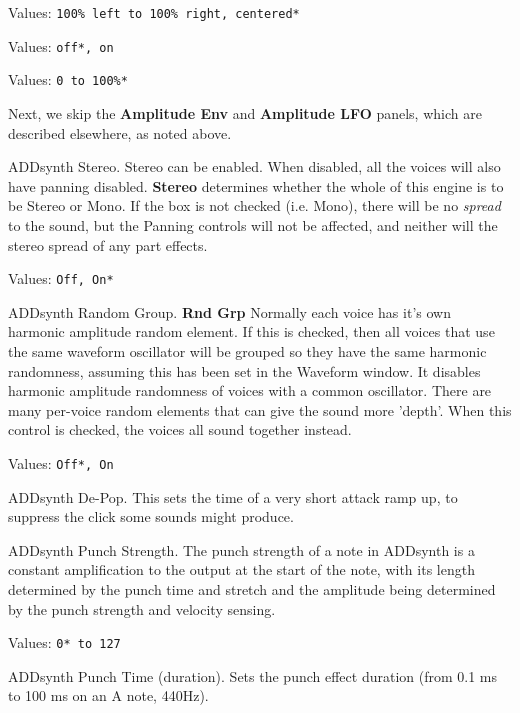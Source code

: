 
   Values: \texttt{100\% left to 100\% right, centered*}


   Values: \texttt{off*, on}


   Values: \texttt{0 to 100\%* }

   Next, we skip the \textbf{Amplitude Env} and \textbf{Amplitude LFO}
   panels, which are described elsewhere, as noted above.

   ADDsynth Stereo.
   Stereo can be enabled.
   When disabled, all the voices will also have panning disabled.
   \textbf{Stereo} determines whether the whole of this engine is to be Stereo or
   Mono. If the box is not checked (i.e. Mono), there will be no \textsl{spread}
   to the sound, but the Panning controls will not be affected, and neither will
   the stereo spread of any part effects.

   Values: \texttt{Off, On*}

   ADDsynth Random Group.
   \textbf{Rnd Grp} Normally each voice has it's own harmonic amplitude
   random element. If this is checked, then all voices that use the same waveform
   oscillator will be grouped so they have the same harmonic randomness, assuming
   this has been set in the Waveform window.
   It disables harmonic amplitude randomness of voices with a common oscillator.
   There are many per-voice random elements that can give the sound more
   'depth'. When this control is checked, the voices all sound together
   instead.

   Values: \texttt{Off*, On}

   ADDsynth De-Pop.
   This sets the time of a very short attack ramp up,
   to suppress the click some sounds might produce.

   ADDsynth Punch Strength.
   The punch strength of a note in ADDsynth is a constant amplification to
   the output at the start of the note, with its length determined by the
   punch time and stretch and the amplitude being determined by the punch
   strength and velocity sensing.

   Values: \texttt{0* to 127}

   ADDsynth Punch Time (duration).
   Sets the punch effect duration (from 0.1 ms to 100 ms on an A note, 440Hz).

